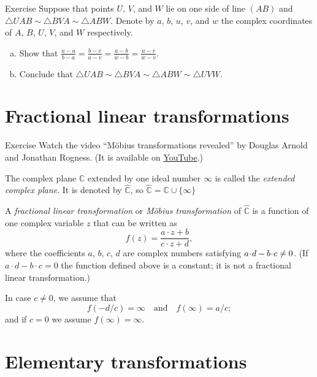 \medskip

\begin{thm}{Exercise}\label{ex:4-sim}
Suppose that points $U$, $V$, and $W$ lie on one side of line $(AB)$ and 
$\triangle UAB\sim \triangle BVA \sim \triangle ABW$.
Denote by $a$, $b$, $u$, $v$, and $w$ the complex coordinates of $A$, $B$, $U$, $V$, and $W$ respectively.
\begin{enumerate}[(a)]
 \item Show that $\tfrac{u-a}{b-a}=\tfrac{b-v}{a-v}=\tfrac{a-b}{w-b}=\tfrac{u-v}{w-v}$.
 \item Conclude that $\triangle UAB\sim \triangle BVA \sim \triangle ABW\sim \triangle UVW$.
\end{enumerate}
 
\end{thm}

\section{Fractional linear transformations}

\begin{thm}{Exercise}\label{ex:movie}
Watch the video ``Möbius transformations revealed'' by Douglas Arnold and Jonathan Rogness.
(It is available on \href{http://youtu.be/JX3VmDgiFnY}{YouTube}.)
\end{thm}


The complex plane $\mathbb{C}$ extended by one ideal number $\infty$ 
is called the \emph{extended complex plane}.
It is denoted by $\hat{\mathbb{C}}$, so $\hat{\mathbb{C}}=\mathbb{C}\cup\{\infty\}$

A \emph{fractional linear transformation} or \emph{M\"obius transformation} of  $\hat{\mathbb{C}}$ is a function of one complex variable $z$
that can be written as
$$f(z) = \frac{a\cdot z + b}{c\cdot z + d},$$
where the coefficients $a$, $b$, $c$, $d$ are complex numbers satisfying $a\cdot d \z- b\cdot c \not= 0$.
(If $a\cdot d - b\cdot c = 0$ the function defined above is a constant; it is not a fractional linear transformation.) 

In case $c\not=0$, we assume that
$$f(-d/c) = \infty
\quad
\text{and}
\quad
f(\infty) = a/c;$$
and if $c=0$ we assume
$f(\infty) = \infty$.

\section{Elementary transformations}

